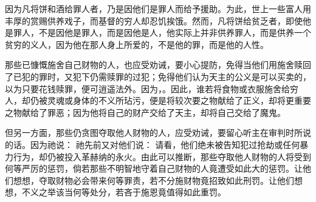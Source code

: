 因为凡将饼和酒给罪人者，乃是因他们是罪人而给予援助。为此，世上一些富人用丰厚的赏赐供养戏子，而基督的穷人却忍饥挨饿。然而，凡将饼给贫乏者，即使他是罪人，不是因他是罪人，而是因他是人，他实际上并非供养罪人，而是供养一个贫穷的义人，因为他在那人身上所爱的，不是他的罪，而是他的人性。\par

那些已慷慨施舍自己财物的人，也应受劝诫，要小心提防，免得当他们用施舍赎回了已犯的罪时，又犯下仍需赎罪的过犯；免得他们认为天主的公义是可以买卖的，以为只要花钱赎罪，便可逍遥法外。因为，。因此，谁若将食物或衣服施舍给穷人，却仍被灵魂或身体的不义所玷污，便是将较次要之物献给了正义，却将更重要之物献给了罪恶；因为他将自己的财产交给了天主，却将自己交给了魔鬼。\par

但另一方面，那些仍贪图夺取他人财物的人，应受劝诫，要留心听主在审判时所说的话。因为祂说： 祂先前又对他们说： 请看，他们绝未被告知犯过抢劫或任何暴力行为，却仍被投入革赫纳的永火。由此可以推断，那些夺取他人财物的人将受到何等严厉的惩罚，倘若那些不明智地守着自己财物的人竟遭受如此大的惩罚。让他们想想，夺取财物必会带来何等罪责，若不分施财物竟招致如此刑罚。让他们想想，不义之举该当何等处分，若吝于施恩竟值得如此重罚。\par

